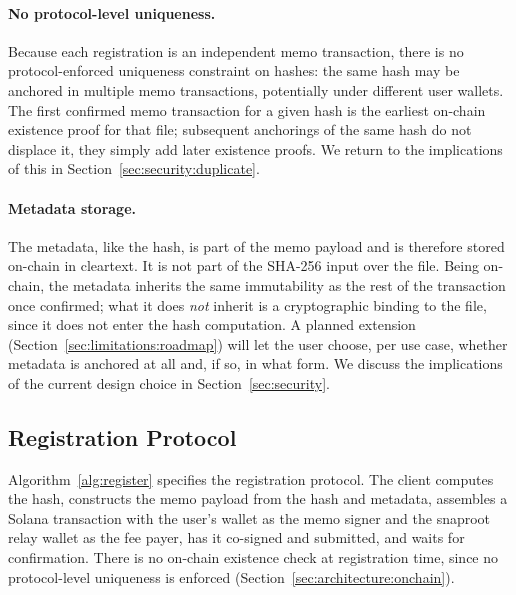 \documentclass[11pt,a4paper]{article}
\begin{document}
\paragraph{No protocol-level uniqueness.} Because each registration is
an independent memo transaction, there is no protocol-enforced
uniqueness constraint on hashes: the same hash may be anchored in
multiple memo transactions, potentially under different user wallets.
The first confirmed memo transaction for a given hash is the earliest
on-chain existence proof for that file; subsequent anchorings of the
same hash do not displace it, they simply add later existence proofs.
We return to the implications of this in
Section~\ref{sec:security:duplicate}.

\paragraph{Metadata storage.} The metadata, like the hash, is part of
the memo payload and is therefore stored on-chain in cleartext. It is
not part of the SHA-256 input over the file. Being on-chain, the
metadata inherits the same immutability as the rest of the
transaction once confirmed; what it does \emph{not} inherit is a
cryptographic binding to the file, since it does not enter the
hash computation. A planned extension
(Section~\ref{sec:limitations:roadmap}) will let the user choose, per
use case, whether metadata is anchored at all and, if so, in what form.
We discuss the implications of the current design choice in
Section~\ref{sec:security}.

\subsection{Registration Protocol}
\label{sec:architecture:register}

Algorithm~\ref{alg:register} specifies the registration protocol. The
client computes the hash, constructs the memo payload from the hash
and metadata, assembles a Solana transaction with the user's wallet as
the memo signer and the snaproot relay wallet as the fee payer, has it
co-signed and submitted, and waits for confirmation. There is no
on-chain existence check at registration time, since no protocol-level
uniqueness is enforced (Section~\ref{sec:architecture:onchain}).
\end{document}
